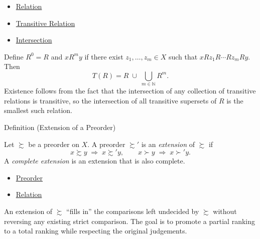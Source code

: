 \begin{dependencies}
\begin{itemize}
  \item \hyperref[def:relation]{Relation}
  \item \hyperref[def:transitive]{Transitive Relation}
  \item \hyperref[def:intersection]{Intersection}
\end{itemize}
\end{dependencies}

\begin{remark*}
Define $R^0 = R$ and $xR^m y$ if there exist $z_1, \ldots, z_m \in X$ such
that $xRz_1 R \cdots R z_m Ry$. Then
\[
  T(R) = R \;\cup\; \bigcup_{m \in \mathbb{N}} R^m.
\]
Existence follows from the fact that the intersection of any collection of
transitive relations is transitive, so the intersection of all transitive
supersets of $R$ is the smallest such relation.
\end{remark*}

\begin{definitionbox}{Definition (Extension of a Preorder)}
\begin{definition}\label{def:preorder-extension}
Let $\succsim$ be a preorder on $X$. A preorder $\succsim'$ is an
\emph{extension} of $\succsim$ if
\[
  x \succsim y \;\Rightarrow\; x \succsim' y,
  \qquad
  x \succ y \;\Rightarrow\; x \succ' y.
\]
A \emph{complete extension} is an extension that is also complete.
\end{definition}
\end{definitionbox}

\begin{dependencies}
\begin{itemize}
  \item \hyperref[def:preorder]{Preorder}
  \item \hyperref[def:relation]{Relation}
\end{itemize}
\end{dependencies}

\begin{remark*}
An extension of $\succsim$ ``fills in'' the comparisons left undecided by
$\succsim$ without reversing any existing strict comparison. The goal is to
promote a partial ranking to a total ranking while respecting the original
judgements.
\end{remark*}

